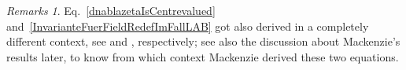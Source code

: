 \documentclass[preprint]{elsarticle}
\theoremstyle{plain}
\theoremstyle{remark}
\newtheorem{remark}[theorem]{Remarks}
\theoremstyle{definition}
\begin{document}
\begin{remark}
\leavevmode\newline
Eq.~\eqref{dnablazetaIsCentrevalued} and~\eqref{InvarianteFuerFieldRedefImFallLAB} got also derived in a completely different context, see \cite[\S 7.2, Lemma 7.2.4, $\zeta$ is denoted as $\Lambda$ there; page 273]{mackenzieGeneralTheory} and \cite[\S 7.2, Proposition 7.2.11, last statement, there $\zeta$ is denoted by $\Lambda$ and $\mathrm{d}^\nabla \zeta$ by $f(\nabla, \Lambda)$; page 276]{mackenzieGeneralTheory}, respectively; 
see also the discussion about Mackenzie's results later, to know from which context Mackenzie derived these two equations.
\end{remark}
\end{document}

